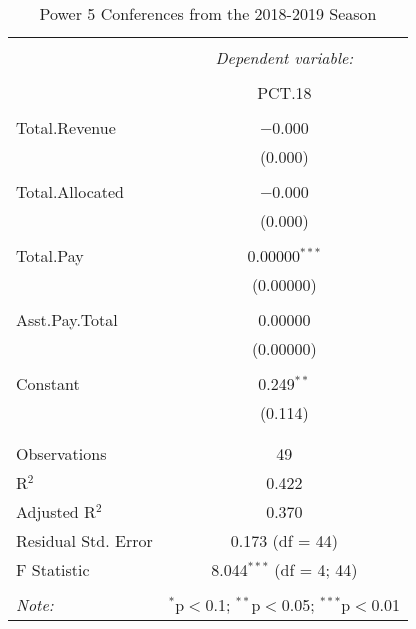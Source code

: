 \documentclass[12pt,english]{article}
\begin{document}
\begin{table}[!htbp] \centering 
\label{Table:Table4}
  \caption{Power 5 Conferences from the 2018-2019 Season} 
  \label{} 
\begin{tabular}{@{\extracolsep{5pt}}lc} 
\\[-1.8ex]\hline 
\hline \\[-1.8ex] 
 & \multicolumn{1}{c}{\textit{Dependent variable:}} \\ 
\cline{2-2} 
\\[-1.8ex] & PCT.18 \\ 
\hline \\[-1.8ex] 
 Total.Revenue & $-$0.000 \\ 
  & (0.000) \\ 
  & \\ 
 Total.Allocated & $-$0.000 \\ 
  & (0.000) \\ 
  & \\ 
 Total.Pay & 0.00000$^{***}$ \\ 
  & (0.00000) \\ 
  & \\ 
 Asst.Pay.Total & 0.00000 \\ 
  & (0.00000) \\ 
  & \\ 
 Constant & 0.249$^{**}$ \\ 
  & (0.114) \\ 
  & \\ 
\hline \\[-1.8ex] 
Observations & 49 \\ 
R$^{2}$ & 0.422 \\ 
Adjusted R$^{2}$ & 0.370 \\ 
Residual Std. Error & 0.173 (df = 44) \\ 
F Statistic & 8.044$^{***}$ (df = 4; 44) \\ 
\hline 
\hline \\[-1.8ex] 
\textit{Note:}  & \multicolumn{1}{r}{$^{*}$p$<$0.1; $^{**}$p$<$0.05; $^{***}$p$<$0.01} \\ 
\end{tabular} 
\end{table} 
\end{document}
